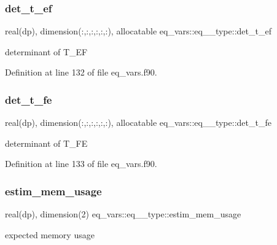\subsubsection{\texorpdfstring{det\+\_\+t\+\_\+ef}{det\_t\_ef}}
{\footnotesize\ttfamily real(dp), dimension(\+:,\+:,\+:,\+:,\+:,\+:), allocatable eq\+\_\+vars\+::eq\+\_\+\_\+type\+::det\+\_\+t\+\_\+ef}



determinant of T\+\_\+\+EF 



Definition at line 132 of file eq\+\_\+vars.\+f90.

\mbox{\label{structeq__vars_1_1eq__2__type_a96e1497e388a30e0bb418c1bfb865f45}} 
\subsubsection{\texorpdfstring{det\+\_\+t\+\_\+fe}{det\_t\_fe}}
{\footnotesize\ttfamily real(dp), dimension(\+:,\+:,\+:,\+:,\+:,\+:), allocatable eq\+\_\+vars\+::eq\+\_\+\_\+type\+::det\+\_\+t\+\_\+fe}



determinant of T\+\_\+\+FE 



Definition at line 133 of file eq\+\_\+vars.\+f90.

\mbox{\label{structeq__vars_1_1eq__2__type_a7b277d4e3358de3cbf97f66e91608025}} 
\subsubsection{\texorpdfstring{estim\+\_\+mem\+\_\+usage}{estim\_mem\_usage}}
{\footnotesize\ttfamily real(dp), dimension(2) eq\+\_\+vars\+::eq\+\_\+\_\+type\+::estim\+\_\+mem\+\_\+usage}



expected memory usage 

